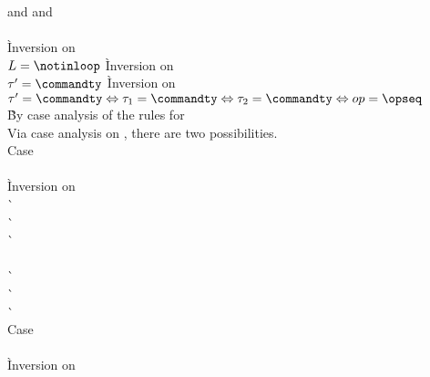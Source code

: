 \begin{description}
\begin{tabbing}
     and  and \\
      \hspace{1em}  \\
      \` Inversion on  \\
    $L = \notinloop$
      \` Inversion on \presbinopunwind{} \\
    $\tau' = \commandty$
      \` Inversion on \presbinopunwind{} \\
    $\tau' = \commandty \Leftrightarrow \tau_1 = \commandty \Leftrightarrow \tau_2 = \commandty \Leftrightarrow op = \opseq$ \\
      \` By case analysis of the rules for  \\
    Via case analysis on , there are two possibilities. \\
    Case  \+ \\
       \\
        \` Inversion on  \\
        \`  \\
        \`  \\
        \`  \\
       \\
        \`  \\
        \`  \\
        \`  \- \\
    Case  \+ \\
       \\
        \` Inversion on  \\

\end{tabbing}
\end{description}
